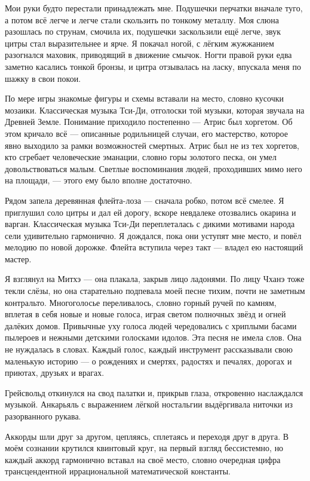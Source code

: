 Мои руки будто перестали принадлежать мне.
Подушечки перчатки вначале туго, а потом всё легче и легче стали скользить по тонкому металлу.
Моя слюна разошлась по струнам, смочила их, подушечки заскользили ещё легче, звук цитры стал выразительнее и ярче.
Я покачал ногой, с лёгким жужжанием разогнался маховик, приводящий в движение смычок.
Ногти правой руки едва заметно касались тонкой бронзы, и цитра отзывалась на ласку, впускала меня по шажку в свои покои.

По мере игры знакомые фигуры и схемы вставали на место, словно кусочки мозаики.
Классическая музыка Тси-Ди, отголоски той музыки, которая звучала на Древней Земле.
Понимание приходило постепенно --- Атрис был хоргетом.
Об этом кричало всё --- описанные родильницей случаи, его мастерство, которое явно выходило за рамки возможностей смертных.
Атрис был не из тех хоргетов, кто сгребает человеческие эманации, словно горы золотого песка, он умел довольствоваться малым.
Светлые воспоминания людей, проходивших мимо него на площади, --- этого ему было вполне достаточно.

Рядом запела деревянная флейта-лоза --- сначала робко, потом всё смелее.
Я приглушил соло цитры и дал ей дорогу, вскоре невдалеке отозвались окарина и варган.
Классическая музыка Тси-Ди переплеталась с дикими мотивами народа сели удивительно гармонично.
Я дождался, пока они уступят мне место, и повёл мелодию по новой дорожке.
Флейта вступила через такт --- владел ею настоящий мастер.

Я взглянул на Митхэ --- она плакала, закрыв лицо ладонями.
По лицу Чханэ тоже текли слёзы, но она старательно подпевала моей песне тихим, почти не заметным контральто.
Многоголосье переливалось, словно горный ручей по камням, вплетая в себя новые и новые голоса, играя светом полночных звёзд и огней далёких домов.
Привычные уху голоса людей чередовались с хриплыми басами пылероев и нежными детскими голосками идолов.
Эта песня не имела слов.
Она не нуждалась в словах.
Каждый голос, каждый инструмент рассказывали свою маленькую историю --- о рождениях и смертях, радостях и печалях, дорогах и приютах, друзьях и врагах.

Грейсвольд откинулся на свод палатки и, прикрыв глаза, откровенно наслаждался музыкой.
Анкарьяль с выражением лёгкой ностальгии выдёргивала ниточки из разорванного рукава.

Аккорды шли друг за другом, цепляясь, сплетаясь и переходя друг в друга.
В моём сознании крутился квинтовый круг, на первый взгляд бессистемно, но каждый аккорд гармонично вставал на своё место, словно очередная цифра трансцендентной иррациональной математической константы.


